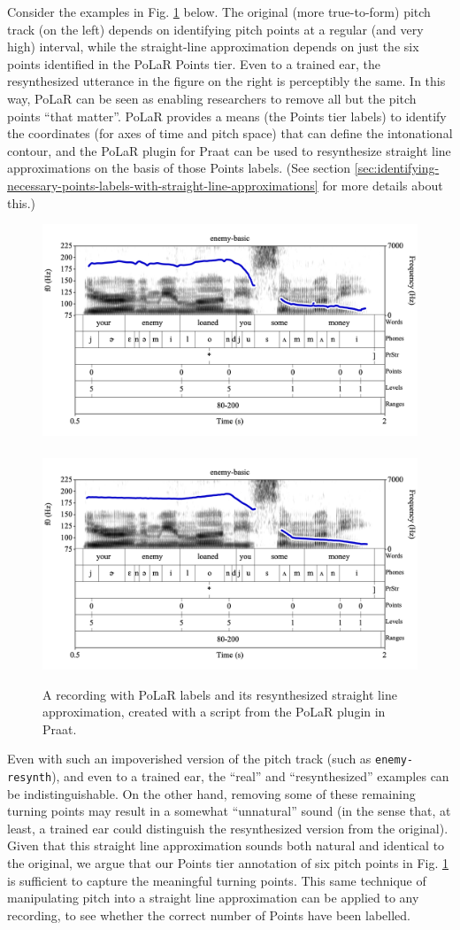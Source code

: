 \documentclass[11pt, twoside]{memoir}
\begin{document}
{{{Consider the examples in Fig. \ref{fig:enemy original and resynth} below. The original (more true-to-form) pitch track (on the left) depends on identifying pitch points at a regular (and very high) interval, while the straight-line approximation depends on just the six points identified in the PoLaR Points tier. Even to a trained ear, the resynthesized utterance in the figure on the right is perceptibly the same. In this way, PoLaR can be seen as enabling researchers to remove all but the pitch points “that matter”. PoLaR provides a means (the Points tier labels) to identify the coordinates (for axes of time and pitch space) that can define the intonational contour, and the PoLaR plugin for Praat can be used to resynthesize straight line approximations on the basis of those Points labels. (See section \ref{sec:identifying-necessary-points-labels-with-straight-line-approximations} for more details about this.)
\begin{figure}[H]
\centering
\includegraphics[width=.485\linewidth]{Contours-enemy.png}~~\includegraphics[width=.485\linewidth]{Contours-enemy-resynth.png}
\caption{A recording with PoLaR labels and its resynthesized straight line approximation, created with a script from the PoLaR plugin in Praat.
\label{fig:enemy original and resynth}
}
\end{figure}
Even with such an impoverished version of the pitch track (such as \texttt{enemy-resynth}), and even to a trained ear, the “real” and “resynthesized” examples can be indistinguishable. On the other hand, removing some of these remaining turning points may result in a somewhat “unnatural” sound (in the sense that, at least, a trained ear could distinguish the resynthesized version from the original). Given that this straight line approximation sounds both natural and identical to the original, we argue that our Points tier annotation of six pitch points in Fig. \ref{fig:enemy original and resynth} is sufficient to capture the meaningful turning points. This same technique of manipulating pitch into a straight line approximation can be applied to any recording, to see whether the correct number of Points have been labelled.
}}}
\end{document}
